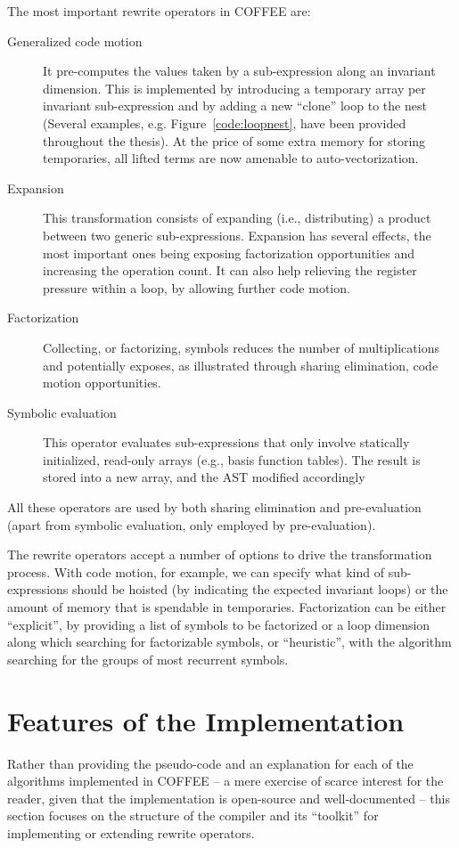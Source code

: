The most important rewrite operators in COFFEE are:
\begin{description}
\item[Generalized code motion] It pre-computes the values taken by a sub-expression along an invariant dimension. This is implemented by introducing a temporary array per invariant sub-expression and by adding a new ``clone'' loop to the nest (Several examples, e.g. Figure~\ref{code:loopnest}, have been provided throughout the thesis). At the price of some extra memory for storing temporaries, all lifted terms are now amenable to auto-vectorization. 
\item[Expansion] This transformation consists of expanding (i.e., distributing) a product between two generic sub-expressions. Expansion has several effects, the most important ones being exposing factorization opportunities and increasing the operation count. It can also help relieving the register pressure within a loop, by allowing further code motion.
\item[Factorization] Collecting, or factorizing, symbols reduces the number of multiplications and potentially exposes, as illustrated through sharing elimination, code motion opportunities.
\item[Symbolic evaluation] This operator evaluates sub-expressions that only involve statically initialized, read-only arrays (e.g., basis function tables). The result is stored into a new array, and the AST modified accordingly
\end{description}
All these operators are used by both sharing elimination and pre-evaluation (apart from symbolic evaluation, only employed by pre-evaluation).

The rewrite operators accept a number of options to drive the transformation process. With code motion, for example, we can specify what kind of sub-expressions should be hoisted (by indicating the expected invariant loops) or the amount of memory that is spendable in temporaries. Factorization can be either ``explicit'', by providing a list of symbols to be factorized or a loop dimension along which searching for factorizable symbols, or ``heuristic'', with the algorithm searching for the groups of most recurrent symbols.

\section{Features of the Implementation}
Rather than providing the pseudo-code and an explanation for each of the algorithms implemented in COFFEE -- a mere exercise of scarce interest for the reader, given that the implementation is open-source and well-documented -- this section focuses on the structure of the compiler and its ``toolkit'' for implementing or extending rewrite operators.

